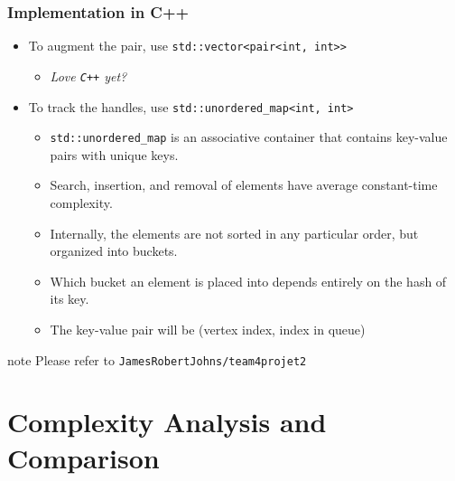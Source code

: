 \documentclass{beamer}
\begin{document}
\begin{frame}
	\frametitle{Implementation in C++}				
	\begin{itemize}
		\item To augment the pair, use \texttt{std::vector<pair<int, int>>} 
		\begin{itemize}
			\item \emph{Love \texttt{C++} yet?}
		\end{itemize}
		\item To track the handles, use \texttt{std::unordered\_map<int, int>} 
		\begin{itemize}
			\item \texttt{std::unordered\_map} is an associative container that contains key-value pairs with unique keys. 
			\item Search, insertion, and removal of elements have average constant-time complexity.
			\item Internally, the elements are not sorted in any particular order, but organized into buckets. 
			\item Which bucket an element is placed into depends entirely on the hash of its key.
			\item The key-value pair will be (vertex index, index in queue)
		\end{itemize}
	\end{itemize}
	\begin{block}{note}
		Please refer to \texttt{JamesRobertJohns/team4projet2} 	
	\end{block}
\end{frame}

\section{Complexity Analysis and Comparison}
\begin{frame}

\end{frame}
\end{document}
